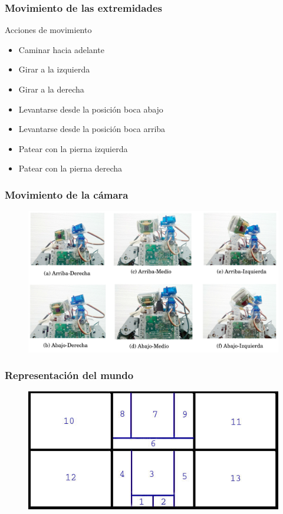 \documentclass{beamer}
\begin{document}
\begin{frame}
\frametitle{Movimiento de las extremidades}

\begin{block}{Acciones de movimiento}
	\begin{itemize}
	\item Caminar hacia adelante
	\item Girar a la izquierda
	\item Girar a la derecha
	\item Levantarse desde la posici\'on boca abajo
	\item Levantarse desde la posici\'on boca arriba
	\item Patear con la pierna izquierda
	\item Patear con la pierna derecha
    \end{itemize}		
\end{block}

\end{frame}



\begin{frame}
\frametitle{Movimiento de la c\'amara}
\begin{figure}[hbtp]
\centering
\includegraphics[scale=0.09]{posicionesCamara.jpg} 
\end{figure}
\end{frame}


\begin{frame}
\frametitle{Representaci\'on del mundo}
\begin{figure}[hbtp]
\centering
\includegraphics[scale=0.5]{Regiones.jpg} 
\end{figure}
\end{frame}
\end{document}
